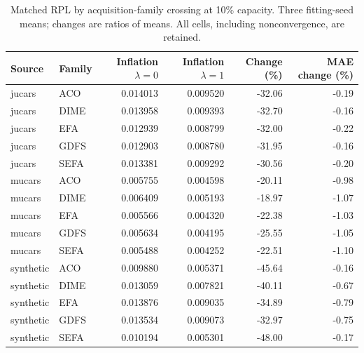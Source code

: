 \begin{table}[htbp]
\centering\small
\caption{Matched RPL by acquisition-family crossing at 10\% capacity. Three fitting-seed means; changes are ratios of means. All cells, including nonconvergence, are retained.}
\label{tab:rpl-five-crossing}
\begin{tabular}{llrrrr}
\toprule Source & Family & Inflation $\lambda=0$ & Inflation $\lambda=1$ & Change (\%) & MAE change (\%)\\\midrule
jucars & ACO & 0.014013 & 0.009520 & -32.06 & -0.19\\
jucars & DIME & 0.013958 & 0.009393 & -32.70 & -0.16\\
jucars & EFA & 0.012939 & 0.008799 & -32.00 & -0.22\\
jucars & GDFS & 0.012903 & 0.008780 & -31.95 & -0.16\\
jucars & SEFA & 0.013381 & 0.009292 & -30.56 & -0.20\\
mucars & ACO & 0.005755 & 0.004598 & -20.11 & -0.98\\
mucars & DIME & 0.006409 & 0.005193 & -18.97 & -1.07\\
mucars & EFA & 0.005566 & 0.004320 & -22.38 & -1.03\\
mucars & GDFS & 0.005634 & 0.004195 & -25.55 & -1.05\\
mucars & SEFA & 0.005488 & 0.004252 & -22.51 & -1.10\\
synthetic & ACO & 0.009880 & 0.005371 & -45.64 & -0.16\\
synthetic & DIME & 0.013059 & 0.007821 & -40.11 & -0.67\\
synthetic & EFA & 0.013876 & 0.009035 & -34.89 & -0.79\\
synthetic & GDFS & 0.013534 & 0.009073 & -32.97 & -0.75\\
synthetic & SEFA & 0.010194 & 0.005301 & -48.00 & -0.17\\
\bottomrule\end{tabular}
\end{table}
